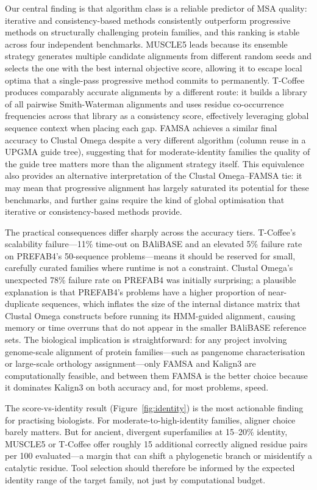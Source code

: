 \documentclass[unnumsec,webpdf,contemporary,large]{oup-authoring-template}
\begin{document}
Our central finding is that algorithm class is a reliable predictor of MSA
quality: iterative and consistency-based methods consistently outperform
progressive methods on structurally challenging protein families, and this
ranking is stable across four independent benchmarks.
MUSCLE5 leads because its ensemble strategy generates multiple candidate
alignments from different random seeds and selects the one with the best
internal objective score, allowing it to escape local optima that a
single-pass progressive method commits to permanently.
T-Coffee produces comparably accurate alignments by a different route:
it builds a library of all pairwise Smith-Waterman alignments and uses
residue co-occurrence frequencies across that library as a consistency
score, effectively leveraging global sequence context when placing each
gap.
FAMSA achieves a similar final accuracy to Clustal Omega despite a very
different algorithm (column reuse in a UPGMA guide tree), suggesting that
for moderate-identity families the quality of the guide tree matters more
than the alignment strategy itself.
This equivalence also provides an alternative interpretation of the
Clustal Omega--FAMSA tie: it may mean that progressive alignment has
largely saturated its potential for these benchmarks, and further gains
require the kind of global optimisation that iterative or consistency-based
methods provide.

The practical consequences differ sharply across the accuracy tiers.
T-Coffee's scalability failure---11\% time-out on BAliBASE and an elevated
5\% failure rate on PREFAB4's 50-sequence problems---means it should be
reserved for small, carefully curated families where runtime is not a
constraint.
Clustal Omega's unexpected 78\% failure rate on PREFAB4 was initially
surprising; a plausible explanation is that PREFAB4's problems have a
higher proportion of near-duplicate sequences, which inflates the size of
the internal distance matrix that Clustal Omega constructs before running
its HMM-guided alignment, causing memory or time overruns that do not
appear in the smaller BAliBASE reference sets.
The biological implication is straightforward: for any project involving
genome-scale alignment of protein families---such as pangenome
characterisation or large-scale orthology assignment---only FAMSA and
Kalign3 are computationally feasible, and between them FAMSA is the better
choice because it dominates Kalign3 on both accuracy and, for most
problems, speed.

The score-vs-identity result (Figure~\ref{fig:identity}) is the most
actionable finding for practising biologists.
For moderate-to-high-identity families, aligner choice barely matters.
But for ancient, divergent superfamilies at 15--20\% identity, MUSCLE5 or
T-Coffee offer roughly 15 additional correctly aligned residue pairs per
100 evaluated---a margin that can shift a phylogenetic branch or
misidentify a catalytic residue.
Tool selection should therefore be informed by the expected identity range
of the target family, not just by computational budget.
\end{document}
